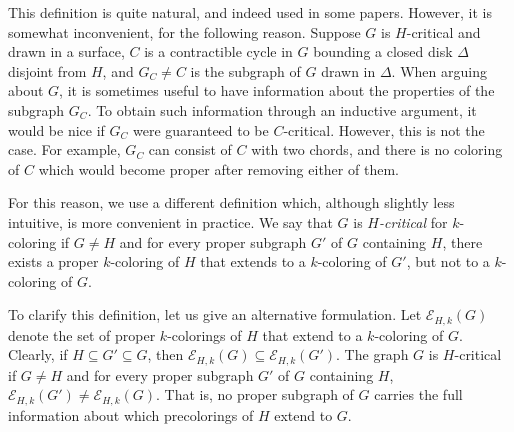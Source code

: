 \documentclass[12pt,twoside,openright,a4paper]{book}
\newcommand{\EE}{\mathcal{E}}
\begin{document}
This definition is quite natural, and indeed used in some papers.  However, it is somewhat inconvenient,
for the following reason.  Suppose $G$ is $H$-critical and drawn in a surface, $C$ is a contractible cycle
in $G$ bounding a closed disk $\Delta$ disjoint from $H$, and $G_C\neq C$ is the subgraph of $G$ drawn in $\Delta$.
When arguing about $G$, it is sometimes useful to have information about the properties of the subgraph $G_C$.
To obtain such information through an inductive argument, it would be nice if $G_C$ were guaranteed to be $C$-critical.
However, this is not the case.  For example, $G_C$ can consist of $C$ with two chords, and there is no coloring of $C$
which would become proper after removing either of them.

For this reason, we use a different definition which, although slightly less intuitive, is more convenient in practice.
We say that $G$ is \emph{$H$-critical} for $k$-coloring if $G\neq H$ and for every proper subgraph $G'$ of $G$ containing $H$,
there exists a proper $k$-coloring of $H$ that extends to a $k$-coloring of $G'$, but not to a $k$-coloring of $G$.

To clarify this definition, let us give an alternative formulation.  Let $\EE_{H,k}(G)$ denote the set of proper $k$-colorings of
$H$ that extend to a $k$-coloring of $G$.  Clearly, if $H\subseteq G'\subseteq G$, then $\EE_{H,k}(G)\subseteq \EE_{H,k}(G')$.
The graph $G$ is $H$-critical if $G\neq H$ and for every proper subgraph $G'$ of $G$ containing $H$, $\EE_{H,k}(G')\neq\EE_{H,k}(G)$.
That is, no proper subgraph of $G$ carries the full information about which precolorings of $H$ extend to $G$.
\end{document}
